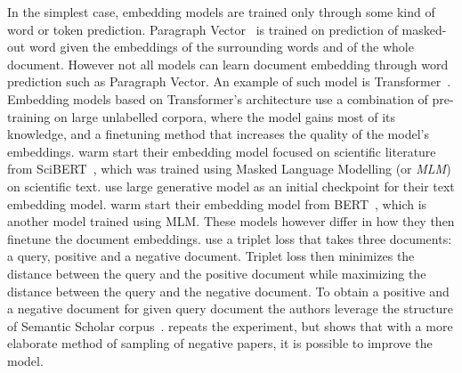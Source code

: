 
In the simplest case, embedding models are trained only through some kind of
word or token prediction. Paragraph Vector~\citep{le2014distributed} is trained
on prediction of masked-out word given the embeddings of the surrounding words
and of the whole document. However not all models can learn document embedding
through word prediction such as Paragraph Vector. An example of such model is
Transformer~\citep{vaswani2017attention}. Embedding models based on
Transformer's architecture use a combination of pre-training on large
unlabelled corpora, where the model gains most of its knowledge, and a
finetuning method that increases the quality of the model's embeddings.
\cite{cohan2020specter} warm start their embedding model focused on scientific
literature from SciBERT~\citep{beltagy2019scibert}, which was trained using
Masked Language Modelling (or \emph{MLM}) on scientific text.
\cite{neelakantan2022text} use large generative model as an initial checkpoint
for their text embedding model. \cite{izacard2021unsupervised} warm start their
embedding model from BERT~\citep{devlin2019bert}, which is another model
trained using MLM. These models however differ in how they then finetune the
document embeddings. \cite{cohan2020specter} use a triplet loss that takes
three documents: a query, positive and a negative document. Triplet loss then
minimizes the distance between the query and the positive document while
maximizing the distance between the query and the negative document. To obtain
a positive and a negative document for given query document the authors
leverage the structure of Semantic Scholar
corpus~\citep{ammar2018construction}. \cite{ostendorff2022neighborhood} repeats
the experiment, but shows that with a more elaborate method of sampling of
negative papers, it is possible to improve the model.

